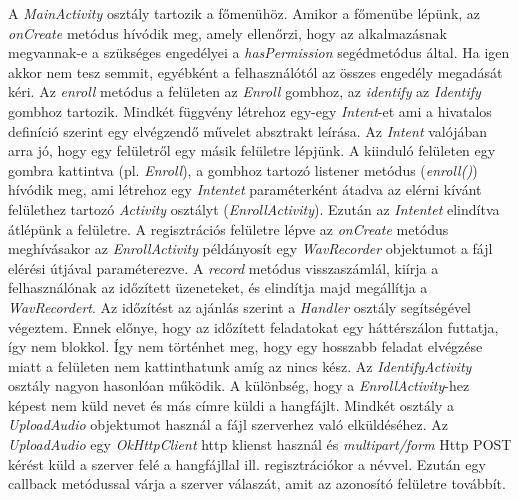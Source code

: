 A \emph{MainActivity} osztály tartozik a főmenühöz. Amikor a főmenübe lépünk, az \emph{onCreate} metódus hívódik meg, amely ellenőrzi, hogy az alkalmazásnak megvannak-e a szükséges engedélyei a \emph{hasPermission} segédmetódus által. Ha igen akkor nem tesz semmit, egyébként a felhasználótól az összes engedély megadását kéri.
\newline
\newline
Az \emph{enroll} metódus a felületen az \emph{Enroll} gombhoz, az \emph{identify} az \emph{Identify} gombhoz tartozik. Mindkét függvény létrehoz egy-egy \emph{Intent}-et ami a hivatalos definíció szerint egy elvégzendő művelet absztrakt leírása. Az \emph{Intent} valójában arra jó, hogy egy felületről egy másik felületre lépjünk. A kiinduló felületen egy gombra kattintva (pl. \emph{Enroll}), a gombhoz tartozó listener metódus (\emph{enroll()}) hívódik meg, ami létrehoz egy \emph{Intentet} paraméterként átadva az elérni kívánt felülethez tartozó \emph{Activity} osztályt (\emph{EnrollActivity}). Ezután az \emph{Intentet} elindítva átlépünk a felületre.
\newline
\newline
A regisztrációs felületre lépve az \emph{onCreate} metódus meghívásakor az \emph{EnrollActivity} példányosít egy \emph{WavRecorder} objektumot a fájl elérési útjával paraméterezve. A \emph{record} metódus visszaszámlál, kiírja a felhasználónak az időzített üzeneteket, és elindítja majd megállítja a \emph{WavRecordert}.
\newline
\newline
Az időzítést az ajánlás szerint a \emph{Handler} osztály segítségével végeztem. Ennek előnye, hogy az időzített feladatokat egy háttérszálon futtatja, így nem blokkol. Így nem történhet meg, hogy egy hosszabb feladat elvégzése miatt a felületen nem kattinthatunk amíg az nincs kész.
\newline
\newline
Az \emph{IdentifyActivity} osztály nagyon hasonlóan működik. A különbség, hogy a \emph{EnrollActivity}-hez képest nem küld nevet és más címre küldi a hangfájlt.
\newline
\newline
Mindkét osztály a \emph{UploadAudio} objektumot használ a fájl szerverhez való elküldéséhez. Az \emph{UploadAudio} egy \emph{OkHttpClient} http klienst használ és \emph{multipart/form} Http POST kérést küld a szerver felé a hangfájllal ill. regisztrációkor a névvel. Ezután egy callback metódussal várja a szerver válaszát, amit az azonosító felületre továbbít.

